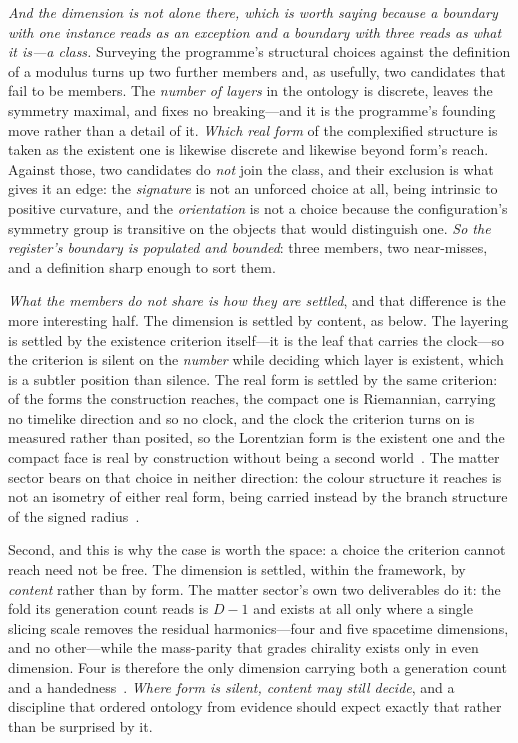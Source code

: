 \documentclass[11pt,a4paper]{article}
\begin{document}
\emph{And the dimension is not alone there, which is worth saying because a boundary with one instance reads as
an exception and a boundary with three reads as what it is---a
class.} Surveying the programme's structural
choices against the definition of a modulus turns up two further members and, as usefully, two candidates that
fail to be members. The \emph{number of layers} in the ontology is discrete, leaves the symmetry maximal, and
fixes no breaking---and it is the programme's founding move rather than a detail of it. \emph{Which real form}
of the complexified structure is taken as the existent one is likewise discrete and likewise beyond form's
reach. Against those, two candidates do \emph{not} join the class, and their exclusion is what gives it an
edge: the \emph{signature} is not an unforced choice at all, being intrinsic to positive curvature, and the
\emph{orientation} is not a choice because the configuration's symmetry group is transitive on the objects that
would distinguish one. \emph{So the register's boundary is populated and bounded}: three members, two
near-misses, and a definition sharp enough to sort them.

\emph{What the members do not share is how they are settled}, and that difference is the more interesting half.
The dimension is settled by content, as below. The layering is settled by the existence criterion itself---it
is the leaf that carries the clock---so the criterion is silent on the \emph{number} while deciding which layer
is existent, which is a subtler position than silence. The real form is settled by the same criterion: of the
forms the construction reaches, the compact one is Riemannian, carrying no timelike direction and so no clock,
and the clock the criterion turns on is measured rather than posited, so the Lorentzian form is the existent one
and the compact face is real by construction without being a second world~\cite{JanzenBoundary,JanzenModernParallax}.
The matter sector bears on that choice in neither direction: the colour structure it reaches is not an isometry
of either real form, being carried instead by the branch structure of the signed radius~\cite{JanzenMatter}.

Second, and this is why the case is worth the space: a choice the criterion cannot reach need not be free. The
dimension is settled, within the framework, by \emph{content} rather than by form. The matter sector's own two
deliverables do it: the fold its generation count reads is $D-1$ and exists at all only where a single slicing
scale removes the residual harmonics---four and five spacetime dimensions, and no other---while the
mass-parity that grades chirality exists only in even dimension. Four is therefore the only dimension carrying
both a generation count and a handedness~\cite{JanzenSlicing,JanzenMatter}. \emph{Where form is silent,
content may still decide}, and a discipline that ordered ontology from evidence should expect exactly that
rather than be surprised by it.
\end{document}
